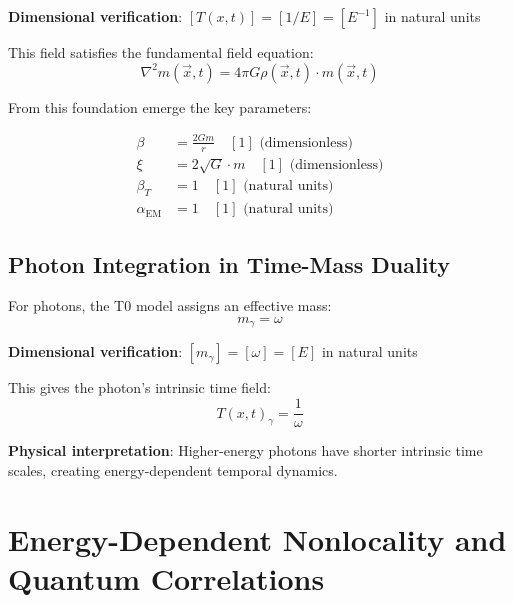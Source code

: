\documentclass[12pt,a4paper]{article}
\newcommand{\Tfield}{T(x,t)}
\begin{document}
	\textbf{Dimensional verification}: $[\Tfield] = [1/E] = [E^{-1}]$ in natural units \checkmark
	
	This field satisfies the fundamental field equation:
	\begin{equation}
		\nabla^2 m(\vec{x},t) = 4\pi G \rho(\vec{x},t) \cdot m(\vec{x},t)
		\label{eq:field_equation}
	\end{equation}
	
	From this foundation emerge the key parameters:
	
	\begin{tcolorbox}[colback=blue!5!white,colframe=blue!75!black,title=T0 Model Parameters for Photon Analysis]
		\begin{align}
			\beta &= \frac{2Gm}{r} \quad [1] \text{ (dimensionless)} \\
			\xi &= 2\sqrt{G} \cdot m \quad [1] \text{ (dimensionless)} \\
			\beta_T &= 1 \quad [1] \text{ (natural units)} \\
			\alpha_{\text{EM}} &= 1 \quad [1] \text{ (natural units)}
		\end{align}
	\end{tcolorbox}
	
	\subsection{Photon Integration in Time-Mass Duality}
	
	For photons, the T0 model assigns an effective mass:
	\begin{equation}
		m_\gamma = \omega
		\label{eq:photon_effective_mass}
	\end{equation}
	
	\textbf{Dimensional verification}: $[m_\gamma] = [\omega] = [E]$ in natural units \checkmark
	
	This gives the photon's intrinsic time field:
	\begin{equation}
		\Tfield_\gamma = \frac{1}{\omega}
		\label{eq:photon_time_field}
	\end{equation}
	
	\textbf{Physical interpretation}: Higher-energy photons have shorter intrinsic time scales, creating energy-dependent temporal dynamics.
	
	\section{Energy-Dependent Nonlocality and Quantum Correlations}
	
\end{document}
